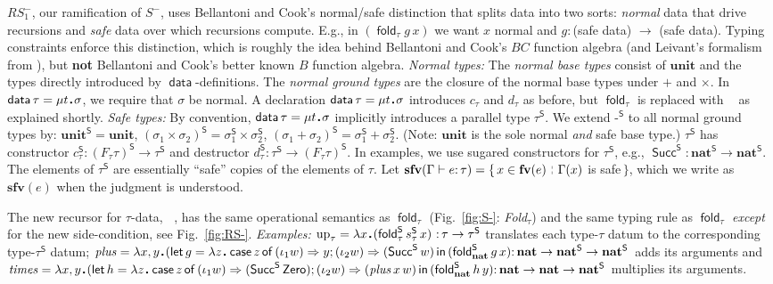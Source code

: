 \documentclass[envcountsame]{llncs}
\newcommand{\sfv}{\ensuremath{\mathbf{sfv}}}\newcommand{\ssize}[1]{\Vert #1\Vert}
\newcommand{\safe}[1]{#1^{\mathsf{S}}}
\newcommand{\key}[1]{\ensuremath{\mathop{\mathsf{#1}}\nolimits}\xspace}
\newcommand{\Case}{\key{case}}
\newcommand{\Of}{\key{of}}
\newcommand{\In}{\key{in}}
\newcommand{\Let}{\key{let}}
\newcommand{\fold}{\key{fold}}
\newcommand{\folds}[1]{\mathop{\safe{\mathsf{fold}}_{#1}}}
\newcommand{\type}[1]{\ensuremath{\mathbf{#1}}\xspace}
\newcommand{\Nat}{\type{nat}}
\newcommand{\Unit}{\ensuremath{\mathbf{unit}}\xspace}
\newcommand{\up}{\ensuremath{\mathord{\mathrm{up}}}\xspace}
\newcommand{\constr}[1]{\ensuremath{\mathop{\mathsf{#1}}\nolimits}\xspace}
\newcommand{\Zero}{\constr{Zero}}
\newcommand{\Succ}{\constr{Succ}}
\newcommand{\data}{\constr{data}}
\newcommand{\lfp}[1]{\mu #1\,\sqdot\,}
\newcommand{\RSmi}{\mathit{RS^-_1}}
\newcommand{\Topic}[1]{\smallskip\noindent{\textbf{#1{.}}}\enspace}
\newcommand{\entails}{\vdash}
\newcommand{\suchthat}{\mathrel{\,\stackrel{\rule{0.03em}{0.5ex}}{\rule[-.1ex]{0.03em}{0.5ex}}\,}}
\newcommand{\sqdot}{\rule{0.5mm}{0.5mm}}
\newcommand{\lam}[1]{\lambda #1\,\sqdot\,}
\newcommand{\fv}{\ensuremath{\mathbf{fv}}}
\newcommand{\of}{\colon}
\renewcommand{\colon}{\mathpunct{:}}
\begin{document}
\Topic{The Ramified Case}
$\RSmi$, our ramification of $S^-$, uses Bellantoni and Cook's
normal/safe distinction that splits data into two sorts:
\emph{normal} data that drive recursions and \emph{safe} data over
which recursions compute. E.g., in $(\fold_\tau g\,x)$ we want $x$
normal and $g\of$(safe data) $\to$ (safe data).  Typing constraints
enforce this distinction, which is roughly the idea behind
Bellantoni and Cook's $BC$ function algebra
\cite[\S5]{BellantoniCook} (and Leivant's formalism from
\cite{Leivant:FM2}), but \textbf{not} Bellantoni and Cook's better
known $B$ function algebra.
\emph{Normal types:}
The \emph{normal base types} consist of $\Unit$ and the types
directly introduced by $\data$-definitions.  The \emph{normal ground
  types} are the closure of the normal base types under $+$
and $\times$.  In $\data \tau = \lfp{t}\sigma$, we require that
$\sigma$ be normal.  A declaration $\data \tau = \lfp{t}\sigma$
introduces $c_\tau$ and $d_\tau$ as before, but $\fold_\tau$ is
replaced with $\folds{\tau}$ as explained shortly.
\emph{Safe types:} 
By convention, $\data \tau = \lfp{t}\sigma$ implicitly introduces a
parallel type $\safe\tau$. We extend -$\safe{}$ to all normal ground types by:
$\safe\Unit=\Unit$,
$\safe{(\sigma_1\times\sigma_2)}=\safe\sigma_1\times\safe\sigma_2$,
$\safe{(\sigma_1+\sigma_2)}=\safe\sigma_1+\safe\sigma_2$.  (Note:
$\Unit$ is the sole normal \emph{and} safe base type.)
$\safe\tau$ has constructor
$\safe{c_\tau}\of\safe{(F_\tau\tau)}\to\safe\tau$ and destructor
$\safe{d_\tau}\of\safe\tau\to\safe{(F_\tau\tau)}$.  In examples, we
use sugared constructors for $\safe\tau$, e.g., $\safe\Succ \of
\safe\Nat\to\safe\Nat$. 
The elements of $\safe\tau$ are essentially  ``safe'' copies of the
elements of $\tau$.  Let $\sfv(\Gamma\entails e\of\tau)
= \{\, x \in\fv(e) \suchthat \Gamma(x)$ is safe$\,\}$, which
we write as $\sfv(e)$ when the judgment is understood.

The new recursor for $\tau$-data,
$\folds{\tau}$, has the same operational semantics as $\fold_\tau$
(Fig.~\ref{fig:S-}: \emph{Fold$_\tau$}) and the same typing rule as
$\fold_\tau$ 
\emph{except} for the new side-condition, see
Fig.~\ref{fig:RS-}.
\emph{Examples:}
$\up_\tau = \lam{x}(\folds{\tau} \safe{s}_\tau\,x)\
\of\tau\to\safe\tau$
translates each type-$\tau$ datum to the corresponding type-$\safe\tau$
datum; 
$\mathit{plus} = 
\lam{x,y}(\Let g =\lam{z} \Case z \Of \,
(\iota_1 w) \Rightarrow y; 
(\iota_2 w)\Rightarrow (\safe\Succ w) 
\In \,(\folds{\Nat} g\, x)\of \Nat\to\safe\Nat\to\safe\Nat$ 
adds its  arguments and 
$\mathit{times} = \lam{x,y}(\Let h =\lam{z} \Case z \Of \,
(\iota_1 w) \Rightarrow (\safe\Succ \Zero); 
\allowbreak
(\iota_2 w)\Rightarrow (\mathit{plus}\,x\,w) 
\In\, (\folds{\Nat} h\, y)\of \Nat\to\Nat\to\safe\Nat$ multiplies
its  arguments. 
\end{document}
